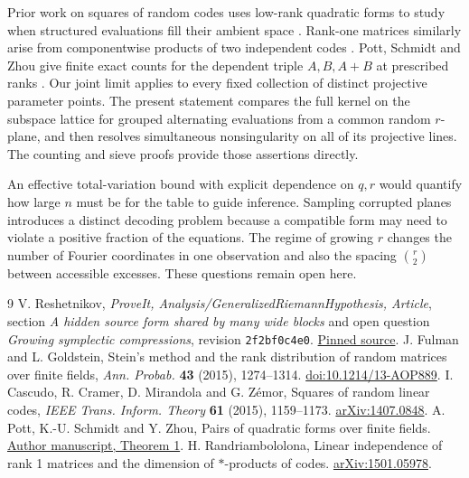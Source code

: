 \documentclass[11pt]{article}
\begin{document}
Prior work on squares of random codes uses low-rank quadratic forms to study when structured evaluations fill their ambient space \cite{cascudo}. Rank-one matrices similarly arise from componentwise products of two independent codes \cite{rand}. Pott, Schmidt and Zhou give finite exact counts for the dependent triple $A,B,A+B$ at prescribed ranks \cite{psz}. Our joint limit applies to every fixed collection of distinct projective parameter points. The present statement compares the full kernel on the subspace lattice for grouped alternating evaluations from a common random $r$-plane, and then resolves simultaneous nonsingularity on all of its projective lines. The counting and sieve proofs provide those assertions directly.

An effective total-variation bound with explicit dependence on $q,r$ would quantify how large $n$ must be for the table to guide inference. Sampling corrupted planes introduces a distinct decoding problem because a compatible form may need to violate a positive fraction of the equations. The regime of growing $r$ changes the number of Fourier coordinates in one observation and also the spacing $\binom r2$ between accessible excesses. These questions remain open here.

\begin{thebibliography}{9}
 V. Reshetnikov, \emph{ProveIt, Analysis/GeneralizedRiemannHypothesis, Article}, section \emph{A hidden source form shared by many wide blocks} and open question \emph{Growing symplectic compressions}, revision \texttt{2f2bf0c4e0}. \href{https://github.com/VladimirReshetnikov/ProveIt/blob/2f2bf0c4e0027ad5397e627da0217644dcd6f95a/Analysis/GeneralizedRiemannHypothesis/Article/sections/spn.tex}{Pinned source}.
 J. Fulman and L. Goldstein, Stein's method and the rank distribution of random matrices over finite fields, \emph{Ann. Probab.} \textbf{43} (2015), 1274--1314. \href{https://doi.org/10.1214/13-AOP889}{doi:10.1214/13-AOP889}.
 I. Cascudo, R. Cramer, D. Mirandola and G. Z\'emor, Squares of random linear codes, \emph{IEEE Trans. Inform. Theory} \textbf{61} (2015), 1159--1173. \href{https://arxiv.org/abs/1407.0848}{arXiv:1407.0848}.
 A. Pott, K.-U. Schmidt and Y. Zhou, Pairs of quadratic forms over finite fields. \href{https://math.uni-paderborn.de/fileadmin-eim/mathematik/AG-Diskrete_Mathematik/Publications-schmidt/quad_pairs.pdf}{Author manuscript, Theorem 1}.
 H. Randriambololona, Linear independence of rank 1 matrices and the dimension of $*$-products of codes. \href{https://arxiv.org/abs/1501.05978}{arXiv:1501.05978}.
\end{thebibliography}
\end{document}
